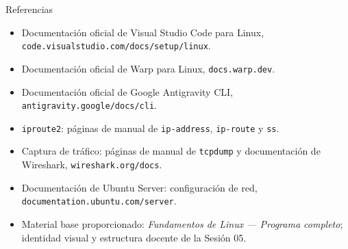 \documentclass[aspectratio=169,10pt,c]{beamer}
\begin{document}
\begin{frame}{Referencias}
\scriptsize
\begin{itemize}\setlength\itemsep{3pt}
  \item Documentación oficial de Visual Studio Code para Linux, \texttt{code.visualstudio.com/docs/setup/linux}.
  \item Documentación oficial de Warp para Linux, \texttt{docs.warp.dev}.
  \item Documentación oficial de Google Antigravity CLI, \texttt{antigravity.google/docs/cli}.
  \item \texttt{iproute2}: páginas de manual de \texttt{ip-address}, \texttt{ip-route} y \texttt{ss}.
  \item Captura de tráfico: páginas de manual de \texttt{tcpdump} y documentación de Wireshark, \texttt{wireshark.org/docs}.
  \item Documentación de Ubuntu Server: configuración de red, \texttt{documentation.ubuntu.com/server}.
  \item Material base proporcionado: \emph{Fundamentos de Linux — Programa completo}; identidad visual y estructura docente de la Sesión 05.
\end{itemize}
\end{frame}
\end{document}
